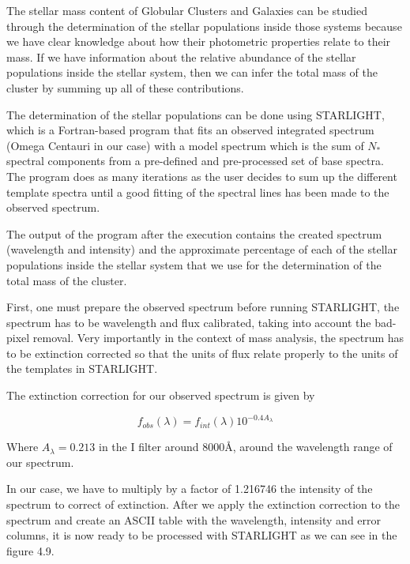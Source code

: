 The stellar mass content of Globular Clusters and Galaxies can be studied through the determination of the stellar populations inside those systems because we have clear knowledge about how their photometric properties relate to their mass. If we have information about the relative abundance of the stellar populations inside the stellar system, then we can infer the total mass of the cluster by summing up all of these contributions. 

The determination of the stellar populations can be done using STARLIGHT, which is a Fortran-based program that fits an observed integrated spectrum (Omega Centauri in our case) with a model spectrum which is the sum of $N_{*}$ spectral components from a pre-defined and pre-processed set of base spectra. The program does as many iterations as the user decides to sum up the different template spectra until a good fitting of the spectral lines has been made to the observed spectrum. 

The output of the program after the execution contains the created spectrum (wavelength and intensity) and the approximate percentage of each of the stellar populations inside the stellar system that we use for the determination of the total mass of the cluster.

First, one must prepare the observed spectrum before running STARLIGHT, the spectrum has to be wavelength and flux calibrated, taking into account the bad-pixel removal. Very importantly in the context of mass analysis, the spectrum has to be extinction corrected so that the units of flux relate properly to the units of the templates in STARLIGHT.     

The extinction correction for our observed spectrum is given by

\begin{equation}
f_{obs}(\lambda)=f_{int}(\lambda)10^{-0.4A_{\lambda}}
\end{equation}

Where $A_{\lambda}=0.213$ in the I filter around $8000 \textrm{\AA}$, around the wavelength range of our spectrum. 

In our case, we have to multiply by a factor of 1.216746 the intensity of the spectrum to correct of extinction. After we apply the extinction correction to the spectrum and create an ASCII table with the wavelength, intensity and error columns, it is now ready to be processed with STARLIGHT as we can see in the figure 4.9.

